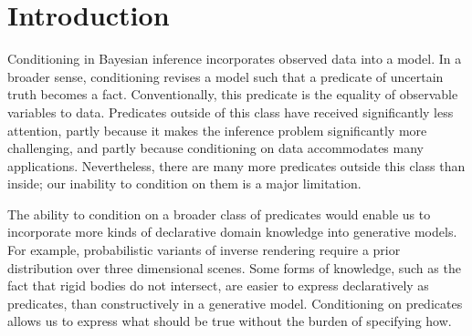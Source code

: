 
\section{Introduction}

Conditioning in Bayesian inference incorporates observed data into a model.
In a broader sense, conditioning revises a model such that a predicate of uncertain truth becomes a fact.
Conventionally, this predicate is the equality of observable variables to data.
Predicates outside of this class have received significantly less attention, partly because it makes the inference problem significantly more challenging, and partly because conditioning on data accommodates many applications.
Nevertheless, there are many more predicates outside this class than inside; our inability to condition on them is a major limitation.

The ability to condition on a broader class of predicates would enable us to incorporate more kinds of declarative domain knowledge into generative models.
For example, probabilistic variants of inverse rendering  \cite{marschner1998inverse,kulkarni2015deep} require a prior distribution over three dimensional scenes.
Some forms of knowledge, such as the fact that rigid bodies do not intersect, are easier to express declaratively as predicates, than constructively in a generative model.
Conditioning on predicates allows us to express what should be true without the burden of specifying how.


